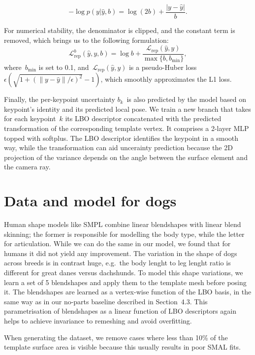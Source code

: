 \begin{equation}\label{e:rep}
-\log p(y | \hat{y}, b) =
\log(2b) + \frac{|y - \hat{y}|}{b}.
\end{equation}

For numerical stability, the denominator is clipped, and the constant term is removed, which brings us to the following formulation:
\begin{equation}\label{e:rep}
\mathcal{L}^b_\text{rep} (\hat{y}, y, b) = 
\log b + \frac{\mathcal{L}_\text{rep}(\hat{y}, y)}{\max\{b, b_{\textrm{min}}\}},
\end{equation}
where~$b_{\textrm{min}}$ is set to 0.1, and~$\mathcal{L}_\text{rep}(\hat{y}, y)$ is a pseudo-Huber loss $\epsilon (\sqrt{1 + (\|y - \hat{y}\|/\epsilon)^2} - 1)$, which smoothly approximates the L1 loss.

Finally, the per-keypoint uncertainty $b_k$~is also predicted by the model based on keypoint's identity and its predicted local pose.
We train a new branch that takes for each keypoint~$k$ its LBO descriptor concatenated with the predicted transformation of the corresponding template vertex. It comprises a 2-layer MLP topped with softplus.
The LBO descriptor identifies the keypoint in a smooth way, while the transformation can aid uncerainty prediction because the 2D projection of the variance depends on the angle between the surface element and the camera ray.

\section{Data and model for dogs}
Human shape models like SMPL combine linear blendshapes with linear blend skinning; the former is responsible for modelling the body type, while the letter for articulation.
While we can do the same in our model, we found that for humans it did not yield any improvement.
The variation in the shape of dogs across breeds is in contrast huge, e.g.~the body lenght to leg lenght ratio is different for great danes versus dachshunds.
To model this shape variations, we learn a set of 5 blendshapes and apply them to the template mesh before posing it.
The blendshapes are learned as a vertex-wise function of the LBO basis, in the same way as in our no-parts baseline described in Section~4.3.
This parametrisation of blendshapes as a linear function of LBO descriptors again helps to achieve invariance to remeshing and avoid overfitting.

When generating the dataset, we remove cases where less than 10\% of the template surface area is visible because this usually results in poor SMAL fits.

